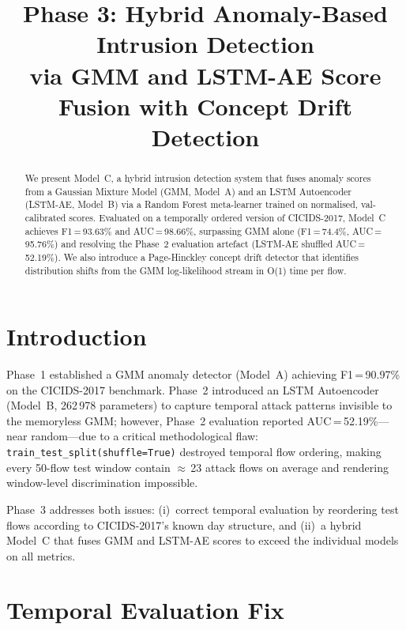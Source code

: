 \documentclass[conference]{IEEEtran}
\title{Phase 3: Hybrid Anomaly-Based Intrusion Detection\\
via GMM and LSTM-AE Score Fusion with Concept Drift Detection}
\author{
  \IEEEauthorblockN{Yash Lunawat}
  \IEEEauthorblockA{CS/AI, Rishihood University\\
  yash.l23csai@nst.rishihood.edu.in}
  \and
  \IEEEauthorblockN{Rishabh}
  \IEEEauthorblockA{CS/AI, Rishihood University}
}
\begin{document}
\maketitle

\begin{abstract}
We present Model~C, a hybrid intrusion detection system that fuses anomaly
scores from a Gaussian Mixture Model (GMM, Model~A) and an LSTM Autoencoder
(LSTM-AE, Model~B) via a Random Forest meta-learner trained on normalised,
val-calibrated scores.  Evaluated on a temporally ordered version of
CICIDS-2017, Model~C achieves F1\,=\,93.63\% and AUC\,=\,98.66\%,
surpassing GMM alone (F1\,=\,74.4\%, AUC\,=\,95.76\%) and resolving the
Phase~2 evaluation artefact (LSTM-AE shuffled AUC\,=\,52.19\%).
We also introduce a Page-Hinckley concept drift detector that identifies
distribution shifts from the GMM log-likelihood stream in O(1) time per flow.
\end{abstract}

\section{Introduction}

Phase~1 established a GMM anomaly detector (Model~A) achieving
F1\,=\,90.97\% on the CICIDS-2017 benchmark.  Phase~2 introduced an
LSTM Autoencoder (Model~B, 262\,978 parameters) to capture temporal attack
patterns invisible to the memoryless GMM; however, Phase~2 evaluation
reported AUC\,=\,52.19\%---near random---due to a critical methodological
flaw: \texttt{train\_test\_split(shuffle=True)} destroyed temporal flow
ordering, making every 50-flow test window contain $\approx$\,23 attack
flows on average and rendering window-level discrimination impossible.

Phase~3 addresses both issues: (i)~correct temporal evaluation by
reordering test flows according to CICIDS-2017's known day structure,
and (ii)~a hybrid Model~C that fuses GMM and LSTM-AE scores to exceed
the individual models on all metrics.

\section{Temporal Evaluation Fix}
\end{document}
